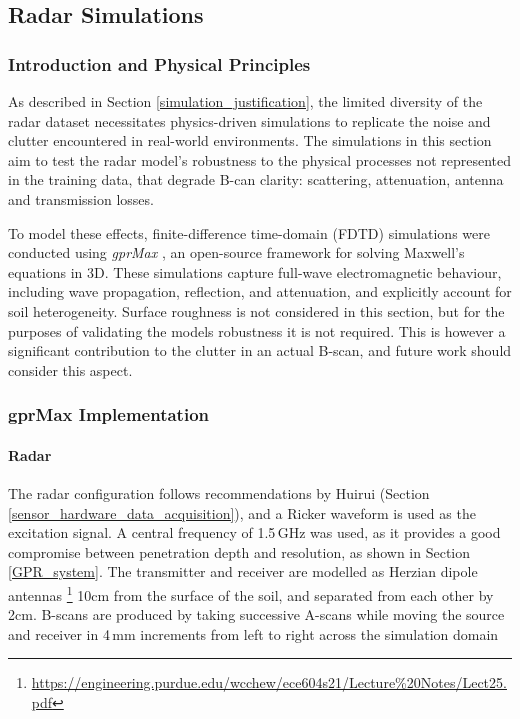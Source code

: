 \subsection{Radar Simulations} \label{compvis_radarsims}

    \subsubsection{Introduction and Physical Principles} \label{rory_radar_principles}
    
        \noindent As described in Section \ref{simulation_justification}, the limited diversity of the radar dataset necessitates physics-driven simulations to replicate the noise and clutter encountered in real-world environments. The simulations in this section aim to test the radar model's robustness to the physical processes not represented in the training data, that degrade B-can clarity: scattering, attenuation, antenna and transmission losses.
        
        \noindent To model these effects, finite-difference time-domain (FDTD) simulations were conducted using \textit{gprMax} \cite{warren2016gprmax}, an open-source framework for solving Maxwell’s equations in 3D. These simulations capture full-wave electromagnetic behaviour, including wave propagation, reflection, and attenuation, and explicitly account for soil heterogeneity. Surface roughness is not considered in this section, but for the purposes of validating the models robustness it is not required. This is however a significant contribution to the clutter in an actual B-scan, and future work should consider this aspect.
     
    
    \subsubsection{gprMax Implementation}

        \paragraph{Radar}
        
             \noindent The radar configuration follows recommendations by Huirui (Section \ref{sensor_hardware_data_acquisition}), and a Ricker waveform is used as the excitation signal. A central frequency of 1.5\,GHz was used, as it provides a good compromise between penetration depth and resolution, as shown in Section \ref{GPR_system}. The transmitter and receiver are modelled as Herzian dipole antennas \footnote{\url{https://engineering.purdue.edu/wcchew/ece604s21/Lecture\%20Notes/Lect25.pdf}} 10cm from the surface of the soil, and separated from each other by 2cm. B-scans are produced by taking successive A-scans while moving the source and receiver in 4\,mm increments from left to right across the simulation domain
    
